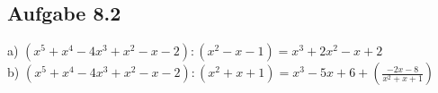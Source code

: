 \documentclass{standalone}
\begin{document}
\subsection{Aufgabe 8.2}

a) $(x^5+x^4-4x^3+x^2-x-2):(x^2-x-1)=x^3+2x^2-x+2$\\
b) $(x^5+x^4-4x^3+x^2-x-2):(x^2+x+1)=x^3-5x+6+\left(\frac{-2x-8}{x^2+x+1}\right)$\\
\end{document}

